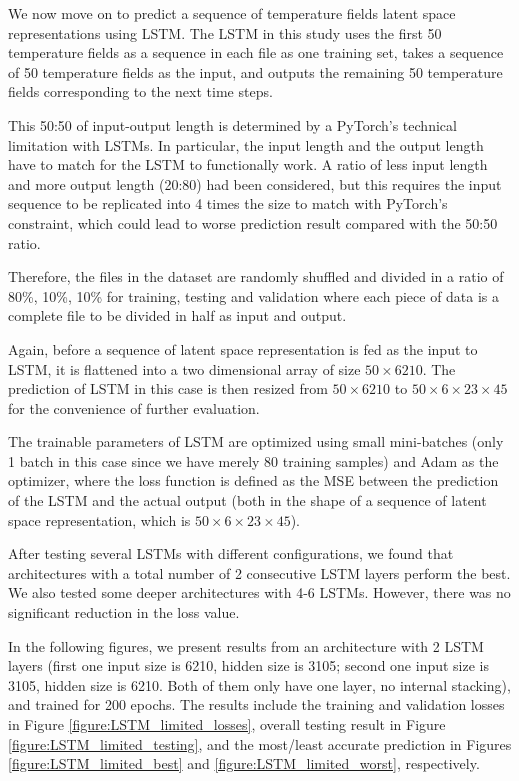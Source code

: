 We now move on to predict a sequence of temperature fields latent space representations using LSTM. The LSTM in this study uses the first 50 temperature fields as a sequence in each file as one training set, takes a sequence of 50 temperature fields as the input, and outputs the remaining 50 temperature fields corresponding to the next time steps.

This 50:50 of input-output length is determined by a PyTorch's technical limitation with LSTMs. In particular, the input length and the output length have to match for the LSTM to functionally work. A ratio of less input length and more output length (20:80) had been considered, but this requires the input sequence to be replicated into 4 times the size to match with PyTorch's constraint, which could lead to worse prediction result compared with the 50:50 ratio.

Therefore, the files in the dataset are randomly shuffled and divided in a ratio of 80\%, 10\%, 10\% for training, testing and validation where each piece of data is a complete file to be divided in half as input and output.

Again, before a sequence of latent space representation is fed as the input to LSTM, it is flattened into a two dimensional array of size $50 \times 6210$. The prediction of LSTM in this case is then resized from $50 \times 6210$ to $50 \times 6 \times 23 \times 45$ for the convenience of further evaluation.

The trainable parameters of LSTM are optimized using small mini-batches (only 1 batch in this case since we have merely 80 training samples) and Adam as the optimizer, where the loss function is defined as the MSE between the prediction of the LSTM and the actual output (both in the shape of a sequence of latent space representation, which is $50 \times 6 \times 23 \times 45$).

After testing several LSTMs with different configurations, we found that architectures with a total number of 2 consecutive LSTM layers perform the best. We also tested some deeper architectures with 4-6 LSTMs. However, there was no significant reduction in the loss value.

In the following figures, we present results from an architecture with 2 LSTM layers (first one input size is 6210, hidden size is 3105; second one input size is 3105, hidden size is 6210. Both of them only have one layer, no internal stacking), and trained for 200 epochs. The results include the training and validation losses in Figure \ref{figure:LSTM_limited_losses}, overall testing result in Figure \ref{figure:LSTM_limited_testing}, and the most/least accurate prediction in Figures \ref{figure:LSTM_limited_best} and \ref{figure:LSTM_limited_worst}, respectively.


